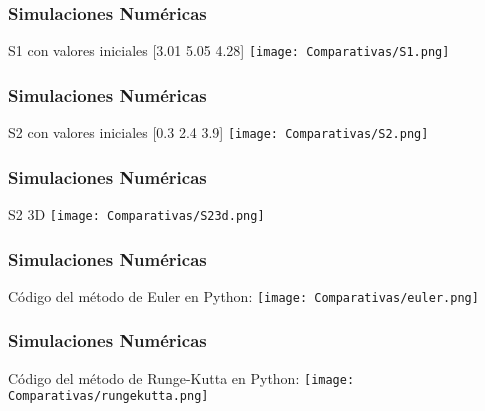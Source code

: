 \documentclass{beamer}
\begin{document}
\begin{frame}
	\frametitle{Simulaciones Num\'ericas}
	\begin{minipage}{10cm}
		S1 con valores iniciales [3.01 5.05 4.28]
		\centering
		\texttt{[image: Comparativas/S1.png]}
		
	\end{minipage}
\end{frame}

\begin{frame}
	\frametitle{Simulaciones Num\'ericas}
	\begin{minipage}{10cm}
		S2 con valores iniciales [0.3 2.4 3.9]
		\centering
		\texttt{[image: Comparativas/S2.png]}
		
	\end{minipage}
\end{frame}

\begin{frame}
	\frametitle{Simulaciones Num\'ericas}
	\begin{minipage}{10cm}
		S2 3D
		\centering
		\texttt{[image: Comparativas/S23d.png]}
		
	\end{minipage}
\end{frame}


\begin{frame}
	\frametitle{Simulaciones Num\'ericas}
	\begin{minipage}{10cm}
		Código del método de Euler en Python:
		\centering
		\texttt{[image: Comparativas/euler.png]}
		
	\end{minipage}
\end{frame}

\begin{frame}
	\frametitle{Simulaciones Num\'ericas}
	\begin{minipage}{10cm}
		Código del método de Runge-Kutta en Python:
		\centering
		\texttt{[image: Comparativas/rungekutta.png]}
		
	\end{minipage}
\end{frame}

\end{document}
